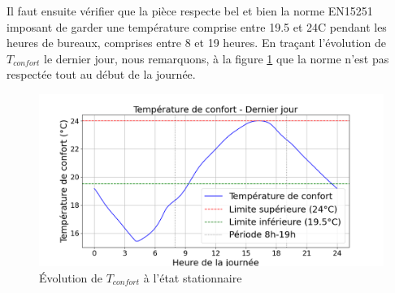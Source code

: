 \documentclass[12pt]{article}
\begin{document}
         Il faut ensuite vérifier que la pièce respecte bel et bien la norme EN15251 imposant de garder une température comprise entre 19.5 et 24\degree C pendant les heures de bureaux, comprises entre 8 et 19 heures. En traçant l'évolution de $T_{confort}$ le dernier jour, nous remarquons, à la figure \ref{fig:dernier_jour} que la norme n'est pas respectée tout au début de la journée.
         \begin{figure}
             \centering
             \includegraphics[width=0.70\linewidth]{Rapport/figures/T_confort_dernier_jour.png}
             \caption{Évolution de $T_{confort}$ à l'état stationnaire}
             \label{fig:dernier_jour}
         \end{figure}
    
            



%
\end{document}
